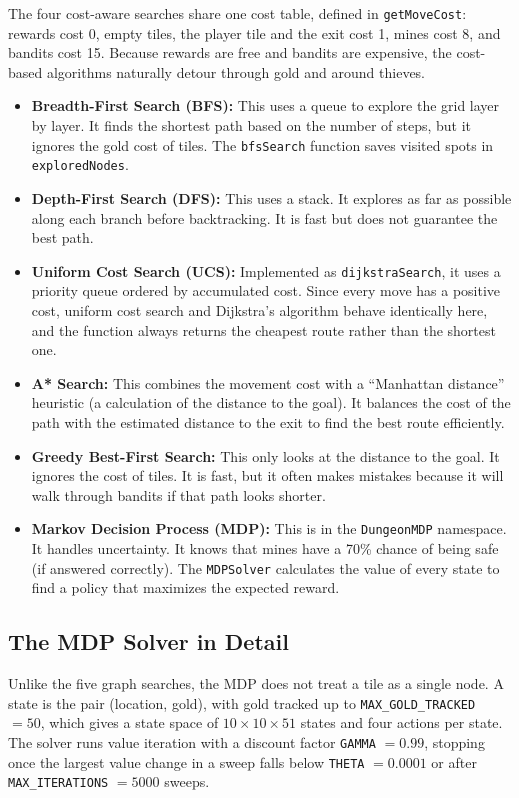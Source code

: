 \documentclass[12pt, a4paper]{article}
\newcommand{\code}[1]{\texttt{#1}}
\begin{document}
The four cost-aware searches share one cost table, defined in \code{getMoveCost}: rewards cost 0, empty tiles, the player tile and the exit cost 1, mines cost 8, and bandits cost 15. Because rewards are free and bandits are expensive, the cost-based algorithms naturally detour through gold and around thieves.

\begin{itemize}
    \item \textbf{Breadth-First Search (BFS):} This uses a queue to explore the grid layer by layer. It finds the shortest path based on the number of steps, but it ignores the gold cost of tiles. The \code{bfsSearch} function saves visited spots in \code{exploredNodes}.
    \item \textbf{Depth-First Search (DFS):} This uses a stack. It explores as far as possible along each branch before backtracking. It is fast but does not guarantee the best path.
    \item \textbf{Uniform Cost Search (UCS):} Implemented as \code{dijkstraSearch}, it uses a priority queue ordered by accumulated cost. Since every move has a positive cost, uniform cost search and Dijkstra's algorithm behave identically here, and the function always returns the cheapest route rather than the shortest one.
    \item \textbf{A* Search:} This combines the movement cost with a ``Manhattan distance'' heuristic (a calculation of the distance to the goal). It balances the cost of the path with the estimated distance to the exit to find the best route efficiently.
    \item \textbf{Greedy Best-First Search:} This only looks at the distance to the goal. It ignores the cost of tiles. It is fast, but it often makes mistakes because it will walk through bandits if that path looks shorter.
    \item \textbf{Markov Decision Process (MDP):} This is in the \code{DungeonMDP} namespace. It handles uncertainty. It knows that mines have a 70\% chance of being safe (if answered correctly). The \code{MDPSolver} calculates the value of every state to find a policy that maximizes the expected reward.
\end{itemize}

\subsection{The MDP Solver in Detail}
Unlike the five graph searches, the MDP does not treat a tile as a single node. A state is the pair (location, gold), with gold tracked up to \code{MAX\_GOLD\_TRACKED} $= 50$, which gives a state space of $10 \times 10 \times 51$ states and four actions per state. The solver runs value iteration with a discount factor \code{GAMMA} $= 0.99$, stopping once the largest value change in a sweep falls below \code{THETA} $= 0.0001$ or after \code{MAX\_ITERATIONS} $= 5000$ sweeps.
\end{document}
